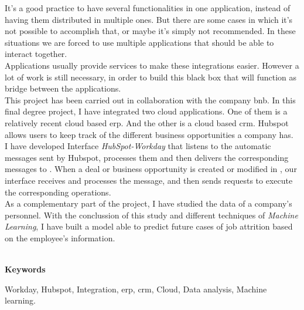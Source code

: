 	It's a good practice to have several functionalities in one application, instead of having them distributed in multiple ones. But there are some cases in which
	it’s not possible to accomplish that, or maybe it's simply not recommended. In these situations we are
	forced to use multiple applications that should be able to interact together.\\

	Applications usually provide services to make these integrations easier. However a lot of work is still necessary, in order to build this black box that will function as bridge between the applications.\\
	
	This project has been carried out in collaboration with the company \acrfull{bnb}. In this final degree project, I have integrated two cloud applications. One of
	them is \wday{} a relatively recent cloud based \acrshort{erp}. And the other is \hs{} a cloud based \acrshort{crm}.
	Hubspot allows users to keep track of the different business opportunities a company has.\\
	
	I have developed Interface \textit{HubSpot-Workday} that listens to the automatic messages sent by Hubspot,
	processes them and then delivers the corresponding messages to \wday{}. When a deal or business
	opportunity is created or modified in \hs{}, our interface receives and processes the message, and then sends \wday{} requests to execute the corresponding operations.\\

	As a complementary part of the project, I have studied the data of a company’s personnel. 
	With the conclussion of this study and different techniques of \textit{Machine Learning}, I have
	built a model able to predict future cases of job attrition based on the employee's information.\\

	
	
	
	\
	
	\textbf{Keywords}
    
    Workday, Hubspot, Integration, \acrfull{erp}, \acrfull{crm}, Cloud, Data analysis, Machine learning.
	
	
